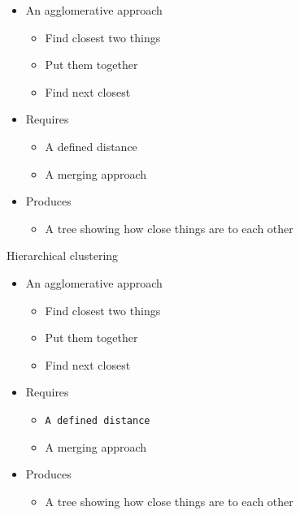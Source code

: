 \documentclass[]{book}
\providecommand{\tightlist}{%
  \setlength{\itemsep}{0pt}\setlength{\parskip}{0pt}}
\begin{document}
\begin{itemize}
\tightlist
\item
  An agglomerative approach

  \begin{itemize}
  \tightlist
  \item
    Find closest two things
  \item
    Put them together
  \item
    Find next closest
  \end{itemize}
\item
  Requires

  \begin{itemize}
  \tightlist
  \item
    A defined distance
  \item
    A merging approach
  \end{itemize}
\item
  Produces

  \begin{itemize}
  \tightlist
  \item
    A tree showing how close things are to each other
  \end{itemize}
\end{itemize}

Hierarchical clustering

\begin{itemize}
\tightlist
\item
  An agglomerative approach

  \begin{itemize}
  \tightlist
  \item
    Find closest two things
  \item
    Put them together
  \item
    Find next closest
  \end{itemize}
\item
  Requires

  \begin{itemize}
  \tightlist
  \item
    \texttt{A\ defined\ distance}
  \item
    A merging approach
  \end{itemize}
\item
  Produces

  \begin{itemize}
  \tightlist
  \item
    A tree showing how close things are to each other
  \end{itemize}
\end{itemize}
\end{document}
